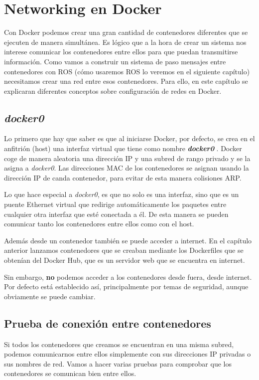 \chapter{Networking en Docker}
Con Docker podemos crear una gran cantidad de contenedores diferentes que se ejecuten de manera simultánea. Es lógico que a la hora de crear un sistema nos interese comunicar los contenedores entre ellos para que puedan transmitirse información. Como vamos a construir un sistema de paso mensajes entre contenedores con ROS (cómo usaremos ROS lo veremos en el siguiente capítulo) necesitamos crear una red entre esos contenedores. Para ello, en este capítulo se explicaran diferentes conceptos sobre configuración de redes en Docker.

	\section{\textit{docker0}}
	Lo primero que hay que saber es que al iniciarse Docker, por defecto, se crea en el anfitrión (host) una interfaz virtual que tiene como nombre \textbf{\emph{docker0}} \cite{docker-network-advanced}. Docker coge de manera aleatoria una dirección IP y una subred de rango privado y se la asigna a \emph{docker0}. Las direcciones MAC de los contenedores se asignan usando la dirección IP de canda contenedor, para evitar de esta manera colisiones ARP.
	
	Lo que hace especial a \emph{docker0}, es que no solo es una interfaz, sino que es un puente Ethernet virtual que redirige automáticamente los paquetes entre cualquier otra interfaz que esté conectada a él. De esta manera se pueden comunicar tanto los contenedores entre ellos como con el host.
	
	Además desde un contenedor también se puede acceder a internet. En el capítulo anterior lanzamos contenedores que se creaban mediante los Dockerfiles que se obtenían del Docker Hub, que es un servidor web que se encuentra en internet. 
	
	Sin embargo, \textbf{no} podemos acceder a los contenedores desde fuera, desde internet. Por defecto está 
	establecido así, principalmente por temas de seguridad, aunque obviamente se puede cambiar.
	
	\section{Prueba de conexión entre contenedores}
	Si todos los contenedores que creamos se encuentran en una misma subred, podemos comunicarnos entre ellos simplemente con sus direcciones IP privadas o sus nombres de red. Vamos a hacer varias pruebas para comprobar que los contenedores se comunican bien entre ellos.
	
